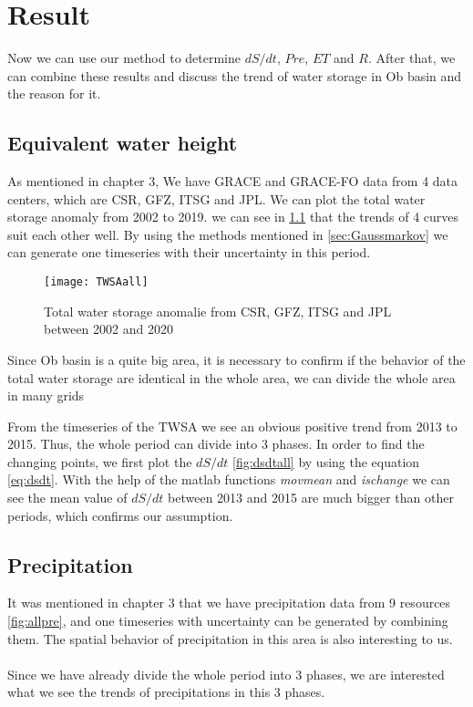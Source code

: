 \chapter{Result}
Now we can use our method to determine $dS/dt$, $Pre$, $ET$ and $R$. After that, we can combine these results and discuss the trend of water storage in Ob basin and the reason for it.
\section{Equivalent water height}
As mentioned in chapter 3, We have GRACE and GRACE-FO data from 4 data centers, which are CSR, GFZ, ITSG and JPL. We can plot the total water storage anomaly from 2002 to 2019. we can see in \ref{fig:4centers} that the trends of 4 curves suit each other well. By using the methods mentioned in \ref{sec:Gaussmarkov} we can generate one timeseries with their uncertainty in this period.
\begin{figure}[htbp]
	\centering
	\texttt{[image: TWSAall]} %
	\caption{Total water storage anomalie from CSR, GFZ, ITSG and JPL between 2002 and 2020} 
	\label{fig:4centers}
\end{figure}

Since Ob basin is a quite big area, it is necessary to confirm if the behavior of the total water storage are identical in the whole area, we can divide the whole area in many grids 


From the timeseries of the TWSA we see an obvious positive trend from 2013 to 2015. Thus, the whole period can divide into 3 phases. In order to find the changing points, we first plot the $dS/dt$ \ref{fig:dsdtall} by using the equation \ref{eq:dsdt}. With the help of the matlab functions \textit{movmean} and \textit{ischange} we can see the mean value of $dS/dt$ between 2013 and 2015 are much bigger than other periods, which confirms our assumption.  


\section{Precipitation}
It was mentioned in chapter 3 that we have precipitation data from 9 resources \ref{fig:allpre}, and one timeseries with uncertainty can be generated by combining them. The spatial behavior of precipitation in this area is also interesting to us. \\\\
Since we have already divide the whole period into 3 phases, we are interested what we see the trends of precipitations in this 3 phases.

